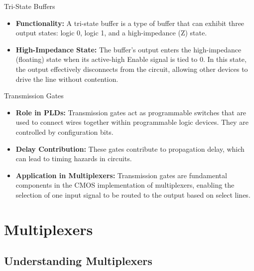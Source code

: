 \documentclass{article}
\begin{document}
Tri-State Buffers

\begin{itemize}
    \item \textbf{Functionality:} A tri-state buffer is a type of buffer that can exhibit three output states: logic 0, logic 1, and a high-impedance (Z) state.
    \item \textbf{High-Impedance State:} The buffer's output enters the high-impedance (floating) state when its active-high Enable signal is tied to 0. In this state, the output effectively disconnects from the circuit, allowing other devices to drive the line without contention.
\end{itemize}

Transmission Gates

\begin{itemize}
    \item \textbf{Role in PLDs:} Transmission gates act as programmable switches that are used to connect wires together within programmable logic devices. They are controlled by configuration bits.
    \item \textbf{Delay Contribution:} These gates contribute to propagation delay, which can lead to timing hazards in circuits.
    \item \textbf{Application in Multiplexers:} Transmission gates are fundamental components in the CMOS implementation of multiplexers, enabling the selection of one input signal to be routed to the output based on select lines.
\end{itemize}

\section{Multiplexers}

\subsection{Understanding Multiplexers}
\end{document}
